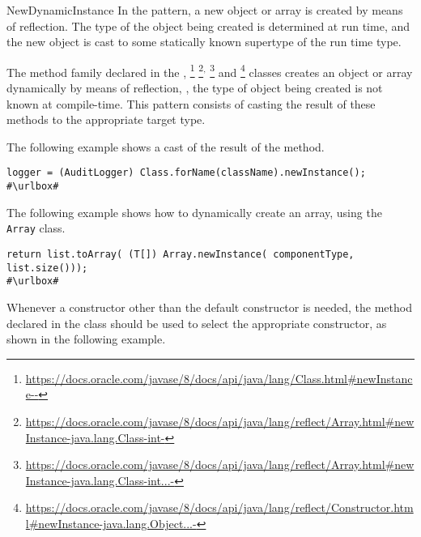 \begin{pattern}{NewDynamicInstance}
In the \thisp{} pattern,
a new object or array is created by means of reflection.
The type of the object being created is determined at run time,
and the new object is cast to some statically known supertype of the run time type.

The  method family declared in the ,%
\footnote{\url{https://docs.oracle.com/javase/8/docs/api/java/lang/Class.html\#newInstance--}}
%
\footnote{\url{https://docs.oracle.com/javase/8/docs/api/java/lang/reflect/Array.html\#newInstance-java.lang.Class-int-}}\(^{,}\)
\footnote{\url{https://docs.oracle.com/javase/8/docs/api/java/lang/reflect/Array.html\#newInstance-java.lang.Class-int...-}}
and %
\footnote{\url{https://docs.oracle.com/javase/8/docs/api/java/lang/reflect/Constructor.html\#newInstance-java.lang.Object...-}}
classes creates an object or array dynamically by means of reflection,
\ie{}, the type of object being created is not known at compile-time.
This pattern consists of casting the result of these methods to the appropriate target type.

\instances{}
The following example shows a cast of the result of the  method.

\def\urlvar{http://bit.ly/apache_hadoop_2HC3IPg}
\begin{verbatim}
logger = (AuditLogger) Class.forName(className).newInstance();
#\urlbox#
\end{verbatim}

The following example shows how to dynamically create an array, using the \texttt{Array} class.

\def\urlvar{http://bit.ly/neo4j_neo4j_2Hp5Hqc}
\begin{verbatim}
return list.toArray( (T[]) Array.newInstance( componentType, list.size()));
#\urlbox#
\end{verbatim}

Whenever a constructor other than the default constructor is needed,
the  method declared in the  class
should be used to select the appropriate constructor,
as shown in the following example.%
\def\urlvar{http://bit.ly/gradle_gradle_2HsUgOo}


\end{pattern}
